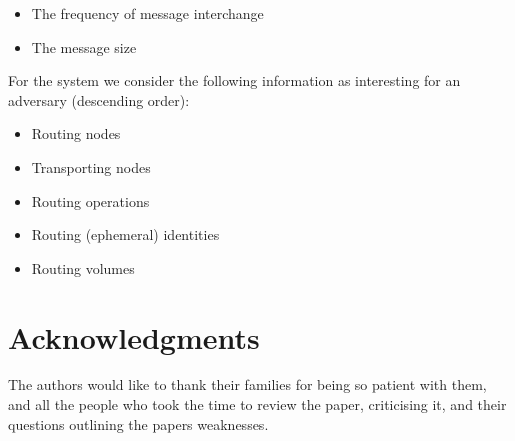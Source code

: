 \documentclass[runningheads]{llncs}
\begin{document}
\begin{itemize}
	\item The frequency of message interchange
	\item The message size
\end{itemize}

For the system we consider the following information as interesting for an adversary (descending order):
\begin{itemize}
	\item Routing nodes
	\item Transporting nodes
	\item Routing operations
	\item Routing (ephemeral) identities
	\item Routing volumes
\end{itemize}



\section*{Acknowledgments}
The authors would like to thank their families for being so patient with them, and all the people who took the time to review the paper, criticising it, and their questions outlining the papers weaknesses.
%
%
%

% 


%
\end{document}

